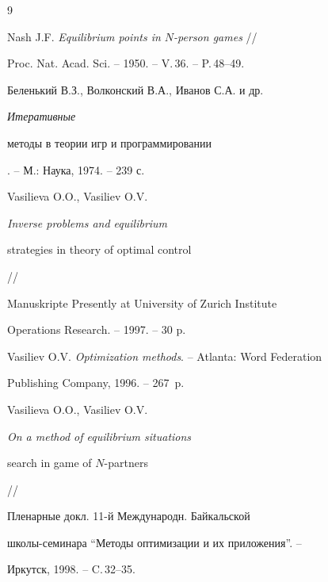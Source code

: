 \begin{thebibliography}{9}







Nash J.F. {\em Equilibrium points in $N$-person games} //


Proc. Nat. Acad. Sci. -- 1950. -- V.\,36. -- P.\,48--49.




Беленький В.З., Волконский В.А., Иванов С.А. и др. {\em Итеративные 


методы в теории игр и программировании}. -- М.: Наука, 1974. -- 239 с.




Vasilieva O.O., Vasiliev O.V. {\em Inverse problems and equilibrium


strategies in theory of optimal control} //


Manuskripte Presently at University of Zurich Institute 


Operations Research. -- 1997. -- 30 p.




Vasiliev O.V. {\em Optimization methods}. -- Atlanta: Word Federation 


Publishing Company, 1996. -- 267~p.




Vasilieva O.O., Vasiliev O.V. {\em On a method of equilibrium situations


search in game of $N$-partners} //


Пленарные докл. 11-й Международн. Байкальской 


школы-семинара ``Методы оптимизации и их приложения''. --


Иркутск, 1998. -- C.\,32--35.





\end{thebibliography}





\vskip 2cm












\label{end}





